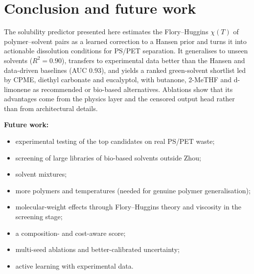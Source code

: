 \documentclass[11pt,a4paper]{article}
\begin{document}
\section{Conclusion and future work}
The solubility predictor presented here estimates the Flory--Huggins $\chi(T)$ of polymer--solvent pairs
as a learned correction to a Hansen prior and turns it into actionable dissolution conditions for PS/PET
separation. It generalises to unseen solvents ($R^2=0.90$), transfers to experimental data better than
the Hansen and data-driven baselines (AUC 0.93), and yields a ranked green-solvent shortlist led by CPME,
diethyl carbonate and eucalyptol, with butanone, 2-MeTHF and d-limonene as recommended or bio-based
alternatives. Ablations show that its advantages come from the physics layer and the censored output
head rather than from architectural details.

\textbf{Future work:}
\begin{itemize}
\item experimental testing of the top candidates on real PS/PET waste;
\item screening of large libraries of bio-based solvents outside Zhou;
\item solvent mixtures;
\item more polymers and temperatures (needed for genuine polymer generalisation);
\item molecular-weight effects through Flory--Huggins theory and viscosity in the screening stage;
\item a composition- and cost-aware score;
\item multi-seed ablations and better-calibrated uncertainty;
\item active learning with experimental data.
\end{itemize}
\end{document}
